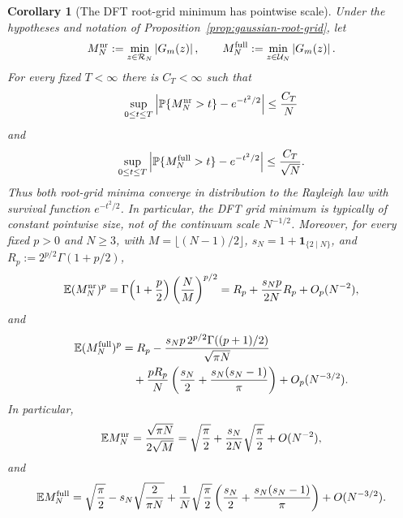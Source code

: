 \documentclass[11pt]{amsart}
\numberwithin{equation}{section}
\newtheorem{corollary}[theorem]{Corollary}
\theoremstyle{definition}
\theoremstyle{remark}
\newcommand{\Prob}{\mathbb P}
\newcommand{\Exp}{\mathbb E}
\newcommand{\abs}[1]{\left\lvert #1\right\rvert}
\begin{document}
\begin{corollary}[The DFT root-grid minimum has pointwise scale]\label{cor:gaussian-root-grid-rayleigh}
Under the hypotheses and notation of Proposition~\ref{prop:gaussian-root-grid},
let
\[
  M_N^{\rm nr}:=\min_{z\in\mathcal R_N}\abs{G_m(z)},
  \qquad
  M_N^{\rm full}:=\min_{z\in\mathcal U_N}\abs{G_m(z)}.
\]
For every fixed \(T<\infty\) there is \(C_T<\infty\) such that
\[
  \sup_{0\le t\le T}
  \left|\Prob\{M_N^{\rm nr}>t\}-e^{-t^2/2}\right|
  \le \frac{C_T}{N}
\]
and
\[
  \sup_{0\le t\le T}
  \left|\Prob\{M_N^{\rm full}>t\}-e^{-t^2/2}\right|
  \le \frac{C_T}{\sqrt N}.
\]
Thus both root-grid minima converge in distribution to the Rayleigh law with
survival function \(e^{-t^2/2}\).  In particular, the DFT grid minimum is
typically of constant pointwise size, not of the continuum scale \(N^{-1/2}\).
Moreover, for every fixed \(p>0\) and \(N\ge3\), with
\(M=\lfloor(N-1)/2\rfloor\), \(s_N=1+\mathbf1_{\{2\mid N\}}\), and
\(R_p:=2^{p/2}\Gamma(1+p/2)\),
\[
  \Exp (M_N^{\rm nr})^p
  =\Gamma\!\left(1+\frac p2\right)\left(\frac{N}{M}\right)^{p/2}
  =R_p+\frac{s_Np}{2N}R_p+O_p(N^{-2}),
\]
and
\[
\begin{aligned}
  \Exp (M_N^{\rm full})^p
  &=R_p
   -\frac{s_Np\,2^{p/2}\Gamma\!\left((p+1)/2\right)}{\sqrt{\pi N}}
   \\
  &\quad
   +\frac{pR_p}{N}\left(\frac{s_N}{2}+\frac{s_N(s_N-1)}{\pi}\right)
   +O_p(N^{-3/2}).
\end{aligned}
\]
In particular,
\[
  \Exp M_N^{\rm nr}=\frac{\sqrt{\pi N}}{2\sqrt M}
  =\sqrt{\frac\pi2}+\frac{s_N}{2N}\sqrt{\frac\pi2}+O(N^{-2}),
\]
and
\[
  \Exp M_N^{\rm full}=\sqrt{\frac\pi2}
  -s_N\sqrt{\frac{2}{\pi N}}
  +\frac1N\sqrt{\frac\pi2}
     \left(\frac{s_N}{2}+\frac{s_N(s_N-1)}{\pi}\right)
  +O(N^{-3/2}).
\]
\end{corollary}
\end{document}
